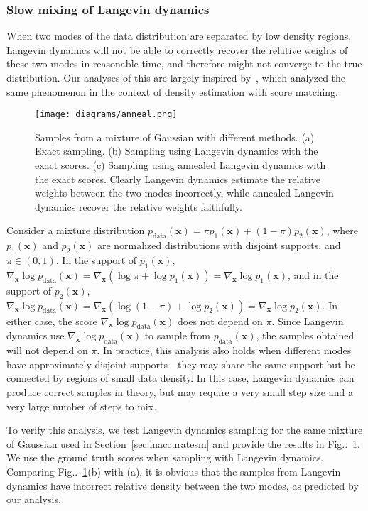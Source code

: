 \documentclass{article}
\makeatletter
\def\@onedot{\ifx\@let@token.\else.\null\fi\xspace}
\DeclareRobustCommand\onedot{\futurelet\@let@token\@onedot}
\newcommand{\figref}[1]{Fig\onedot~\ref{#1}}
\newcommand{\bfx}{\mathbf{x}}
\makeatother
\begin{document}
\subsubsection{Slow mixing of Langevin dynamics}

When two modes of the data distribution are separated by low density regions, Langevin dynamics will not be able to correctly recover the relative weights of these two modes in reasonable time, and therefore might not converge to the true distribution. Our analyses of this are largely inspired by~\cite{wenliang2018learning}, which analyzed the same phenomenon in the context of density estimation with score matching.

\begin{figure}[h]
    \centering
    \texttt{[image: diagrams/anneal.png]}
    \caption{Samples from a mixture of Gaussian with different methods. (a) Exact sampling. (b) Sampling using Langevin dynamics with the exact scores. (c) Sampling using annealed Langevin dynamics with the exact scores. Clearly Langevin dynamics estimate the relative weights between the two modes incorrectly, while annealed Langevin dynamics recover the relative weights faithfully.
    }
    \label{fig:anneal}
\end{figure}


Consider a mixture distribution $p_\text{data}(\bfx) = \pi p_1(\bfx) + (1 - \pi) p_2(\bfx)$, where $p_1(\bfx)$ and $p_2(\bfx)$ are normalized distributions with disjoint supports, and $\pi \in (0,1)$. In the support of $p_1(\bfx)$, $\nabla_\bfx \log p_\text{data}(\bfx) = \nabla_\bfx (\log \pi + \log p_1(\bfx)) = \nabla_\bfx \log p_1(\bfx)$, and in the support of $p_2(\bfx)$, $\nabla_\bfx \log p_\text{data}(\bfx) = \nabla_\bfx (\log (1-\pi) + \log p_2(\bfx)) = \nabla_\bfx \log p_2(\bfx)$. In either case, the score $\nabla_\bfx \log p_\text{data}(\bfx)$ does not depend on $\pi$. Since Langevin dynamics use $\nabla_\bfx \log p_\text{data}(\bfx)$ to sample from $p_\text{data}(\bfx)$, the samples obtained will not depend on $\pi$. In practice, this analysis also holds when different modes have approximately disjoint supports---they may share the same support but be connected by regions of small data density. In this case, Langevin dynamics can produce correct samples in theory, but may require a very small step size and a very large number of steps to mix.

To verify this analysis, we test Langevin dynamics sampling for the same mixture of Gaussian used in Section~\ref{sec:inaccuratesm} and provide the results in \figref{fig:anneal}. We use the ground truth scores when sampling with Langevin dynamics. Comparing \figref{fig:anneal}(b) with (a), it is obvious that the samples from Langevin dynamics have incorrect relative density between the two modes, as predicted by our analysis.
\end{document}
